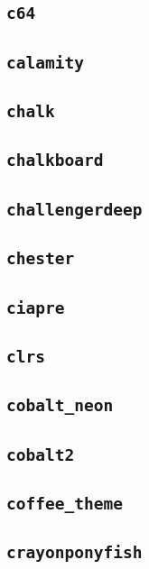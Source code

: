 \subsection{\texttt{c64}}
\newpage
\subsection{\texttt{calamity}}
\newpage
\subsection{\texttt{chalk}}
\newpage
\subsection{\texttt{chalkboard}}
\newpage
\subsection{\texttt{challengerdeep}}
\newpage
\subsection{\texttt{chester}}
\newpage
\subsection{\texttt{ciapre}}
\newpage
\subsection{\texttt{clrs}}
\newpage
\subsection{\texttt{cobalt\_neon}}
\newpage
\subsection{\texttt{cobalt2}}
\newpage
\subsection{\texttt{coffee\_theme}}
\newpage
\subsection{\texttt{crayonponyfish}}
\newpage
